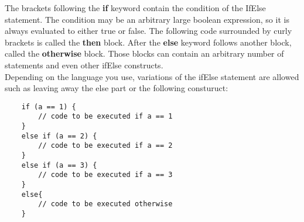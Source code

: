 \documentclass{scrreprt}
\begin{document}
The brackets following the \textbf{if} keyword contain the condition of the IfElse statement. The condition may be an arbitrary large boolean expression, so it is always evaluated to either true or false. The following code surrounded by curly brackets is called the \textbf{then} block. After the \textbf{else} keyword follows another block, called the \textbf{otherwise} block. Those blocks can contain an arbitrary number of statements and even other ifElse constructs. \\
Depending on the language you use, variations of the ifElse statement are allowed such as leaving away the else part or the following consturuct:
\begin{lstlisting}
	if (a == 1) {
		// code to be executed if a == 1
	}
	else if (a == 2) {
		// code to be executed if a == 2
	}
	else if (a == 3) {
		// code to be executed if a == 3
	}
	else{
		// code to be executed otherwise
	}
\end{lstlisting}
\end{document}
